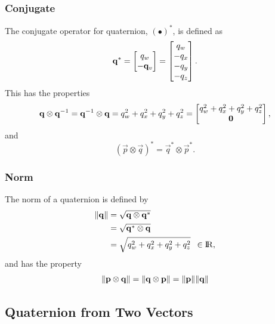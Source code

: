 \subsubsection{Conjugate}

The conjugate operator for quaternion, ${(\bullet)}^{\ast}$, is
defined as
%
\begin{equation}
  {{\mathbf{q}}}^{\ast}
  =
  \begin{bmatrix}
    q_w \\
    - {\mathbf{q}}_v
  \end{bmatrix}
  =
  \begin{bmatrix}
    q_w \\
    - q_x \\
    - q_y \\
    - q_z
  \end{bmatrix}.
\end{equation}
%
This has the properties
%
\begin{equation}
  {{\mathbf{q}}} \otimes {{\mathbf{q}}}^{-1}
  = {{\mathbf{q}}}^{-1} \otimes {{\mathbf{q}}}
  = q_{w}^{2} + q_{x}^{2} + q_{y}^{2} + q_{z}^{2}
  =
  \begin{bmatrix}
    q_{w}^{2} + q_{x}^{2} + q_{y}^{2} + q_{z}^{2} \\
    {\mathbf{0}}
  \end{bmatrix},
\end{equation}
%
and
%
\begin{equation}
  (\Vec{p} \otimes \Vec{q})^{\ast}
  = \Vec{q}^{\ast} \otimes \Vec{p}^{\ast}.
\end{equation}


\subsubsection{Norm}

The norm of a quaternion is defined by
%
\begin{align}
  {\|{{\mathbf{q}}}\|} &= \sqrt{{{\mathbf{q}}} \otimes {{\mathbf{q}}}^{\ast}} \\
    &= \sqrt{{{\mathbf{q}}}^{\ast} \otimes {{\mathbf{q}}}} \\
    &= \sqrt{q_{w}^{2} + q_{x}^{2} + q_{y}^{2} + q_{z}^{2}}
    \enspace \in {\rm I\!R},
\end{align}
%
and has the property
%
\begin{align}
  {\|{\mathbf{p}} \otimes {\mathbf{q}}\|} =
  {\|{\mathbf{q}} \otimes {\mathbf{p}}\|} =
  {\|{\mathbf{p}}\|} {\|{\mathbf{q}}\|}
\end{align}


\subsection{Quaternion from Two Vectors}


